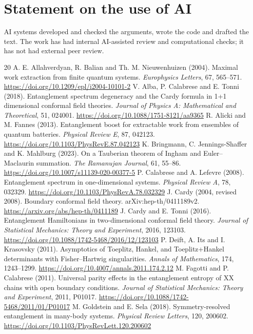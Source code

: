 \documentclass[11pt,a4paper]{article}
\theoremstyle{remark}
\begin{document}
\section*{Statement on the use of AI}
AI systems developed and checked the arguments, wrote the code and drafted the text. The work has had internal AI-assisted review and computational checks; it has not had external peer review.

\begin{thebibliography}{20}\small
{} A. E. Allahverdyan, R. Balian and Th. M. Nieuwenhuizen (2004). Maximal work extraction from finite quantum systems. \emph{Europhysics Letters}, 67, 565--571. \url{https://doi.org/10.1209/epl/i2004-10101-2}
 V. Alba, P. Calabrese and E. Tonni (2018). Entanglement spectrum degeneracy and the Cardy formula in 1+1 dimensional conformal field theories. \emph{Journal of Physics A: Mathematical and Theoretical}, 51, 024001. \url{https://doi.org/10.1088/1751-8121/aa9365}
 R. Alicki and M. Fannes (2013). Entanglement boost for extractable work from ensembles of quantum batteries. \emph{Physical Review E}, 87, 042123. \url{https://doi.org/10.1103/PhysRevE.87.042123}
 K. Bringmann, C. Jennings-Shaffer and K. Mahlburg (2023). On a Tauberian theorem of Ingham and Euler--Maclaurin summation. \emph{The Ramanujan Journal}, 61, 55--86. \url{https://doi.org/10.1007/s11139-020-00377-5}
 P. Calabrese and A. Lefevre (2008). Entanglement spectrum in one-dimensional systems. \emph{Physical Review A}, 78, 032329. \url{https://doi.org/10.1103/PhysRevA.78.032329}
 J. Cardy (2004, revised 2008). Boundary conformal field theory. arXiv:hep-th/0411189v2. \url{https://arxiv.org/abs/hep-th/0411189}
 J. Cardy and E. Tonni (2016). Entanglement Hamiltonians in two-dimensional conformal field theory. \emph{Journal of Statistical Mechanics: Theory and Experiment}, 2016, 123103. \url{https://doi.org/10.1088/1742-5468/2016/12/123103}
 P. Deift, A. Its and I. Krasovsky (2011). Asymptotics of Toeplitz, Hankel, and Toeplitz+Hankel determinants with Fisher--Hartwig singularities. \emph{Annals of Mathematics}, 174, 1243--1299. \url{https://doi.org/10.4007/annals.2011.174.2.12}
 M. Fagotti and P. Calabrese (2011). Universal parity effects in the entanglement entropy of XX chains with open boundary conditions. \emph{Journal of Statistical Mechanics: Theory and Experiment}, 2011, P01017. \url{https://doi.org/10.1088/1742-5468/2011/01/P01017}
 M. Goldstein and E. Sela (2018). Symmetry-resolved entanglement in many-body systems. \emph{Physical Review Letters}, 120, 200602. \url{https://doi.org/10.1103/PhysRevLett.120.200602}

\end{thebibliography}
\end{document}
